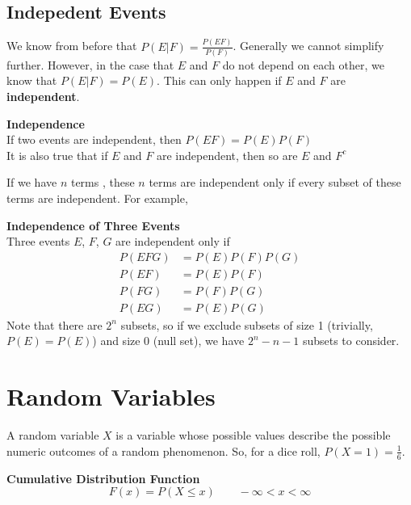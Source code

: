 \documentclass[10pt,a4paper]{article}
\begin{document}
    \subsection{Indepedent Events}
    We know from before that $P(E|F) = \frac{P(EF)}{P(F)}$. Generally we cannot simplify further. However, in the case that $E$ and $F$ do not depend on each other, we know that $P(E|F) = P(E)$. This can only happen if $E$ and $F$ are \textbf{independent}.
    \begin{framed}
        \centering\textbf{Independence} \\
        If two events are independent, then $P(EF) = P(E)P(F)$ \\
        It is also true that if $E$ and $F$ are independent, then so are $E$ and $F^c$
    \end{framed}
    If we have $n$ terms , these $n$ terms are independent only if every subset of these terms are independent. For example,
    \begin{framed}
        \centering\textbf{Independence of Three Events} \\
        \centering Three events $E$, $F$, $G$ are independent only if 
        \begin{align*}
            P(EFG) &= P(E)P(F)P(G)   \\
            P(EF) &= P(E)P(F)  \\
            P(FG) &= P(F)P(G) \\
            P(EG) &= P(E)P(G) 
        \end{align*}
        Note that there are $2^n$ subsets, so if we exclude subsets of size 1 (trivially, $P(E) = P(E)$) and size 0 (null set), we have $2^n - n - 1$ subsets to consider.
    \end{framed}
    \newpage
    \section{Random Variables}
    A random variable $X$ is a variable whose possible values describe the possible numeric outcomes of a random phenomenon. So, for a dice roll, $P(X = 1) = \frac{1}{6}$.
        \begin{framed}
            \centering\textbf{Cumulative Distribution Function}
            $$F(x) = P(X \leq x) \qquad -\infty < x < \infty$$
        \end{framed}
\end{document}
